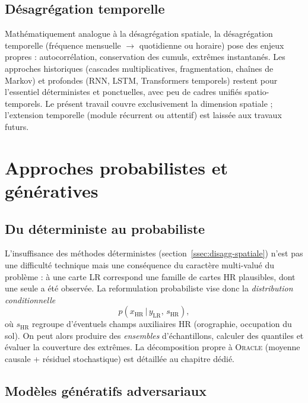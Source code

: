\documentclass[14pt,a4paper,openany]{extreport}
\theoremstyle{definition}
\newcommand{\Oracle}{\textsc{Oracle}}
\newcommand{\LR}{\ensuremath{\text{LR}}}
\newcommand{\HR}{\ensuremath{\text{HR}}}
\newcommand{\xHR}{\ensuremath{x_{\HR}}}
\newcommand{\yLR}{\ensuremath{y_{\LR}}}
\begin{document}
\subsection{Désagrégation temporelle}
\label{ssec:disagg-temporelle}

Mathématiquement analogue à la désagrégation spatiale, la désagrégation temporelle (fréquence mensuelle $\to$ quotidienne ou horaire) pose des enjeux propres : autocorrélation, conservation des cumuls, extrêmes instantanés. Les approches historiques (cascades multiplicatives, fragmentation, chaînes de Markov) et profondes (RNN, LSTM, Transformers temporels) restent pour l'essentiel déterministes et ponctuelles, avec peu de cadres unifiés spatio-temporels. Le présent travail couvre exclusivement la dimension spatiale ; l'extension temporelle (module récurrent ou attentif) est laissée aux travaux futurs.

\section{Approches probabilistes et génératives}
\label{sec:generatifs}

\subsection{Du déterministe au probabiliste}
\label{ssec:det-vs-proba}

L'insuffisance des méthodes déterministes (section~\ref{ssec:disagg-spatiale}) n'est pas une difficulté technique mais une conséquence du caractère multi-valué du problème : à une carte LR correspond une famille de cartes HR plausibles, dont une seule a été observée. La reformulation probabiliste vise donc la \emph{distribution conditionnelle}
\begin{equation}
  p\!\left(\xHR \,\big|\, \yLR,\, s_{\HR}\right),
  \label{eq:objectif-proba}
\end{equation}
où $s_{\HR}$ regroupe d'éventuels champs auxiliaires HR (orographie, occupation du sol). On peut alors produire des \emph{ensembles} d'échantillons, calculer des quantiles et évaluer la couverture des extrêmes. La décomposition propre à \Oracle{} (moyenne causale + résiduel stochastique) est détaillée au chapitre dédié.

\subsection{Modèles génératifs adversariaux}
\label{ssec:gan}
\end{document}
